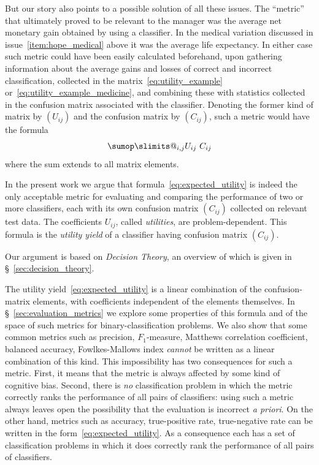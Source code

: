 \documentclass[\ifafour a4paper,12pt,\else a5paper,10pt,\fi%
onecolumn,oneside,article,%
british%
]{memoir}
\makeatletter
\theoremstyle{remark}
\theoremstyle{innote}
\def\sum{\DOTSI\sumop\slimits@}
\renewcommand*{\|}[1][]{\nonscript\:#1\vert\nonscript\:\mathopen{}}
\newcommand*{\sect}{\S}%
\makeatother
\begin{document}
\bigskip

But our story also points to a possible solution of all these issues. The \enquote{metric} that ultimately proved to be relevant to the manager was the average net monetary gain obtained by using a classifier. In the medical variation discussed in issue~\ref{item:hope_medical} above it was the average life expectancy.  In either case such metric could have been easily calculated beforehand, upon gathering information about the average gains and losses of correct and incorrect classification, collected in the matrix~\eqref{eq:utility_example} or~\eqref{eq:utility_example_medicine}, and combining these with statistics collected in the confusion matrix associated with the classifier. Denoting the former kind of matrix by $(U_{ij})$ and the confusion matrix by $(C_{ij})$, such a metric would have the formula
\begin{equation}
  \label{eq:expected_utility}
  \sum_{i,j} U_{ij}\ C_{ij} 
\end{equation}
where the sum extends to all matrix elements.

\medskip

In the present work we argue that formula~\eqref{eq:expected_utility} is indeed the only acceptable metric for evaluating and comparing the performance of two or more classifiers, each with its own confusion matrix $(C_{ij})$ collected on relevant test data. The coefficients $U_{ij}$, called \emph{utilities}, are problem-dependent. This formula is the \emph{utility yield} of a classifier having confusion matrix $(C_{ij})$.

Our argument is based on \emph{Decision Theory}, an overview of which is given in \sect~\ref{sec:decision_theory}.

The utility yield~\eqref{eq:expected_utility} is a linear combination of the confusion-matrix elements, with coefficients independent of the elements themselves. In \sect~\ref{sec:evaluation_metrics} we explore some properties of this formula and of the space of such metrics for binary-classification problems. We also show that some common metrics such as precision, $F_{1}$-measure, Matthews correlation coefficient, balanced accuracy, Fowlkes-Mallows index \emph{cannot} be written as a linear combination of this kind. This impossibility has two consequences for such a metric. First, it means that the metric is always affected by some kind of cognitive bias. Second, there is \emph{no} classification problem in which the metric correctly ranks the performance of all pairs of classifiers: using such a metric always leaves open the possibility that the evaluation is incorrect \emph{a priori}. On the other hand, metrics such as accuracy, true-positive rate, true-negative rate can be written in the form~\eqref{eq:expected_utility}. As a consequence each has a set of classification problems in which it does correctly rank the performance of all pairs of classifiers.
\end{document}
